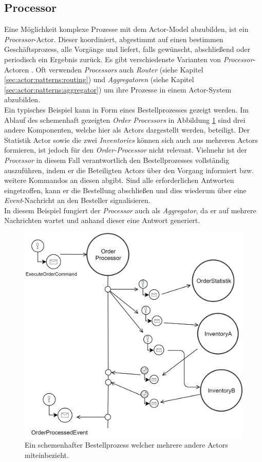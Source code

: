 \subsection{Processor}\label{sub:actor:patterns:processor}
Eine Möglichkeit komplexe Prozesse mit dem Actor-Model abzubilden, ist ein \textit{Processor}-Actor. Dieser koordiniert, abgestimmt auf einen bestimmen Geschäftsprozess, alle Vorgänge und liefert, falls gewünscht, abschließend oder periodisch ein Ergebnis zurück. Es gibt verschiedenste Varianten von \textit{Processor}-Actoren \citep{Vernon2015ReactiveAkka}.
Oft verwenden \textit{Processors} auch \textit{Router} (siehe Kapitel \ref{sec:actor:patterns:routing}) und \textit{Aggregatoren} (siehe Kapitel \ref{sec:actor:patterns:aggregator}) um ihre Prozesse in einem Actor-System abzubilden. \\
Ein typisches Beispiel kann in Form eines Bestellprozesses gezeigt werden. Im Ablauf des schemenhaft gezeigten \textit{Order Processors} in Abbildung \ref{fig:actor:patterns:orderProcesseor} sind drei andere Komponenten, welche hier als Actors dargestellt werden, beteiligt. Der Statistik Actor sowie die zwei \textit{Inventories} können sich auch aus mehreren Actors formieren, ist jedoch für den \textit{Order-Processor} nicht relevant. Vielmehr ist der \textit{Processor} in diesem Fall verantwortlich den Bestellprozesses vollständig auszuführen, indem er die Beteiligten Actors über den Vorgang informiert bzw. weitere Kommandos an diesen abgibt. Sind alle erforderlichen Antworten eingetroffen, kann er die Bestellung abschließen und dies wiederum über eine \textit{Event}-Nachricht an den Besteller signalisieren. \\
In diesem Beispiel fungiert der \textit{Processor} auch als \textit{Aggregator}, da er auf mehrere Nachrichten wartet und anhand dieser eine Antwort generiert. 

\begin{figure}
  \centering
  \includegraphics[width=0.9\linewidth]{gfx/actor/patterns/simpleOrderProcesor}
  \caption{Ein schemenhafter Bestellprozess welcher mehrere andere Actors miteinbezieht.}
  \label{fig:actor:patterns:orderProcesseor}
\end{figure}

